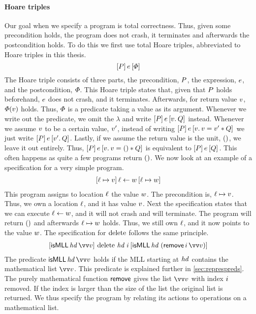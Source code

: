 \documentclass[thesis.tex]{subfiles}
\begin{document}
\paragraph{Hoare triples}
Our goal when we specify a program is total correctness. Thus, given some precondition holds, the program does not crash, it terminates and afterwards the postcondition holds. To do this we first use total Hoare triples, abbreviated to Hoare triples in this thesis.
\[\hoare{\prop}{\expr}{\pred}\]
The Hoare triple consists of three parts, the precondition, $P$, the expression, $e$, and the postcondition, $\varPhi$. This Hoare triple states that, given that $P$ holds beforehand, $e$ does not crash, and it terminates. Afterwards, for return value $v$,  $\varPhi(v)$ holds. Thus, $\varPhi$ is a predicate taking a value as its argument. Whenever we write out the predicate, we omit the $\lambda$ and write $\hoare{\prop}{\expr}{\Ret\val. \propB}$ instead. Whenever we assume $v$ to be a certain value, $v'$, instead of writing $\hoare{\prop}\expr{\Ret\val. \val = \val' * \propB}$ we just write $\hoare{\prop}\expr{\Ret\val'. \propB}$. Lastly, if we assume the return value is the unit, $()$, we leave it out entirely. Thus, $\hoare{\prop}\expr{\Ret\val. \val = \TT * \propB}$ is equivalent to $\hoare{\prop}\expr{\propB}$. This often happens as quite a few programs return $()$. We now look at an example of a specification for a very simple program.
\begin{align*}
  \hoare{\loc\fmapsto\val}{\loc\gets\valB}{\loc\fmapsto\valB}
\end{align*}
This program assigns to location $\ell$ the value $w$. The precondition is, $\loc\fmapsto\val$. Thus, we own a location $\ell$, and it has value $v$. Next the specification states that we can execute $\ell\leftarrow w$, and it will not crash and will terminate. The program will return $()$ and afterwards $\loc\fmapsto\valB$ holds. Thus, we still own $\ell$, and it now points to the value $w$. The specification for $\operatorname{delete}$ follows the same principle.
\begin{align*}
  \hoare{\isMLL\, \hd\, \vect{\val}}{\MLLdelete\, \hd\; \iindex }{\isMLL\, \hd\; (\textlog{remove}\, \iindex\, \vect{\val})}
\end{align*}
The predicate $\isMLL\, \hd\, \vect{\val}$ holds if the MLL starting at $\mathit{hd}$ contains the mathematical list $\vect{\val}$. This predicate is explained further in \cref*{sec:represpreds}. The purely mathematical function $\textsf{\upshape remove}$ gives the list $\vect{\val}$ with index $i$ removed. If the index is larger than the size of the list the original list is returned. We thus specify the program by relating its actions to operations on a mathematical list.
\end{document}
